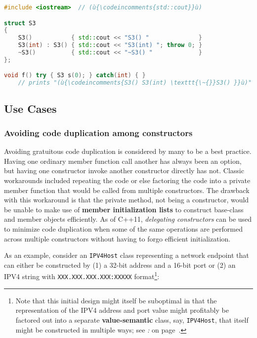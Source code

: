 \begin{lstlisting}[language=C++]
#include <iostream>  // (ù{\codeincomments{std::cout}}ù)

struct S3
{
    S3()           { std::cout << "S3() "              }
    S3(int) : S3() { std::cout << "S3(int) "; throw 0; }
    ~S3()          { std::cout << "~S3() "             }
};

void f() try { S3 s(0); } catch(int) { }
    // prints "(ù{\codeincomments{S3() S3(int) \texttt{\~{}}S3() }}ù)" to (ù{\codeincomments{stdout}}ù)
\end{lstlisting}


\subsection[Use Cases]{Use Cases}\label{ctordelegating-use-cases}

\subsubsection[Avoiding code duplication among constructors]{Avoiding code duplication among constructors}\label{avoiding-code-duplication-among-constructors}

Avoiding gratuitous code duplication is considered by many to be a best
practice. Having one ordinary member function call another has always
been an option, but having one constructor invoke another constructor
directly has not. Classic workarounds included repeating the code or
else factoring the code into a private member function that would be
called from multiple constructors. The drawback with this workaround is
that the private method, not being a constructor, would be unable to
make use of \textbf{member initialization lists} to construct base-class
and member objects efficiently. As of C++11, \emph{delegating
constructors} can be used to minimize code duplication when some of
the same operations are performed across multiple constructors without
having to forgo efficient initialization.

As an example, consider an \texttt{IPV4Host} class representing a
network endpoint that can either be constructed by (1) a 32-bit address
and a 16-bit port or (2) an IPV4 string with
\texttt{XXX.XXX.XXX.XXX:XXXXX} format{\cprotect\footnote{Note that
this initial design might itself be suboptimal in that the
representation of the IPV4 address and port value might profitably be
factored out into a separate \textbf{value-semantic} class, say,
\texttt{IPV4Host}, that itself might be constructed in multiple ways;
  see {\it{}:} {\it{}} on page~\pageref{suboptimal-factoring}.}}:

